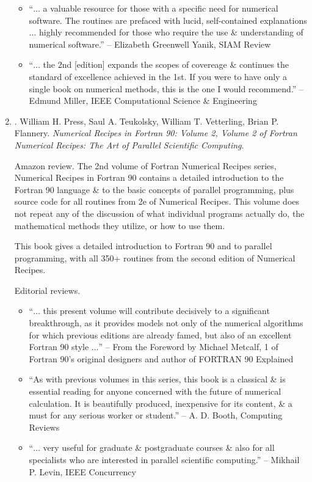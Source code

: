 \documentclass{article}
\begin{document}
\begin{enumerate}
\begin{itemize}
		\item ``$\ldots$ a valuable resource for those with a specific need for numerical software. The routines are prefaced with lucid, self-contained explanations $\ldots$ highly recommended for those who require the use \& understanding of numerical software.'' -- {\sc Elizabeth Greenwell Yanik}, SIAM Review
		\item ``$\ldots$ the 2nd [edition] expands the scopes of covereage \& continues the standard of excellence achieved in the 1st. If you were to have only a single book on numerical methods, this is the one I would recommend.'' -- {\sc Edmund Miller}, IEEE Computational Science \& Engineering
	\end{itemize}
	
	\item \cite{Press_Teukolsky_Vetterling_Flannery_recipe_Fortran90}. {\sc William H. Press, Saul A. Teukolsky, William T. Vetterling, Brian P. Flannery}. {\it Numerical Recipes in Fortran 90: Volume 2, Volume 2 of Fortran Numerical Recipes: The Art of Parallel Scientific Computing}. {}
	
	{\sf Amazon review.} The 2nd volume of Fortran Numerical Recipes series, Numerical Recipes in Fortran 90 contains a detailed introduction to the Fortran 90 language \& to the basic concepts of parallel programming, plus source code for all routines from 2e of Numerical Recipes. This volume does not repeat any of the discussion of what individual programs actually do, the mathematical methods they utilize, or how to use them.
	
	This book gives a detailed introduction to Fortran 90 and to parallel programming, with all 350+ routines from the second edition of Numerical Recipes.
	
	{\sf Editorial reviews.}
	\begin{itemize}
		\item ``$\ldots$ this present volume will contribute decisively to a significant breakthrough, as it provides models not only of the numerical algorithms for which previous editions are already famed, but also of an excellent Fortran 90 style $\ldots$'' -- From the Foreword by {\sc Michael Metcalf}, 1 of Fortran 90's original designers and author of FORTRAN 90 Explained
		\item ``As with previous volumes in this series, this book is a classical \& is essential reading for anyone concerned with the future of numerical calculation. It is beautifully produced, inexpensive for its content, \& a must for any serious worker or student.'' -- {\sc A. D. Booth}, Computing Reviews
		\item ``$\ldots$ very useful for graduate \& postgraduate courses \& also for all specialists who are interested in parallel scientific computing.'' -- {\sc Mikhail P. Levin}, IEEE Concurrency
	\end{itemize}
	

\end{enumerate}
\end{document}
